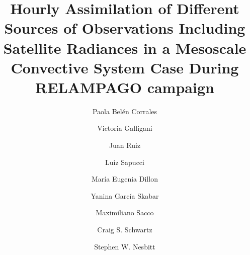 \documentclass[authoryear,preprint,review,12pt]{elsarticle} %
\begin{document}
\begin{frontmatter}

  \title{Hourly Assimilation of Different Sources of Observations Including Satellite Radiances in a Mesoscale Convective System Case During RELAMPAGO campaign}
    \author[UBA,CIMA,CNRS]{Paola Belén Corrales}
    \author[UBA,CIMA,CNRS]{Victoria Galligani}
  
    \author[UBA,CIMA,CNRS]{Juan Ruiz}
  
    \author[INPE]{Luiz Sapucci}
  
    \author[SMN,CONICET]{María Eugenia Dillon}
  
    \author[SMN,CONICET,CNRS]{Yanina García Skabar}
  
    \author[SMN]{Maximiliano Sacco}
  
    \author[NCAR]{Craig S. Schwartz}
  
    \author[Illinois]{Stephen W. Nesbitt}
  
      \address[UBA]{Universidad de Buenos Aires, Facultad de Ciencias Exactas y Naturales, Departamento de Ciencias de la Atmósfera y los Océanos. Buenos Aires, Argentina.}
    \address[CIMA]{CONICET -- Universidad de Buenos Aires. Centro de Investigaciones del Mar y la Atmósfera (CIMA). Buenos Aires, Argentina.}
    \address[CNRS]{CNRS -- IRD -- CONICET -- UBA. Instituto Franco-Argentino para el Estudio del Clima y sus Impactos (IRL 3351 IFAECI). Buenos Aires, Argentina.}
    \address[SMN]{Servicio Meteorológico Nacional de Argentina.}
    \address[CONICET]{CONICET (Consejo Nacional de Investigaciones Científicas y Técnicas).}
    \address[INPE]{National Institute for Space Research, Brazil, Center for Weather Forecasting and Climate Studies.}
    \address[NCAR]{National Center for Atmospheric Research, Boulder, Colorado.}
    \address[Illinois]{Department of Atmospheric Sciences, University of Illinois Urbana--Champaign, Urbana, Illinois.}
  

\end{frontmatter}
\end{document}
